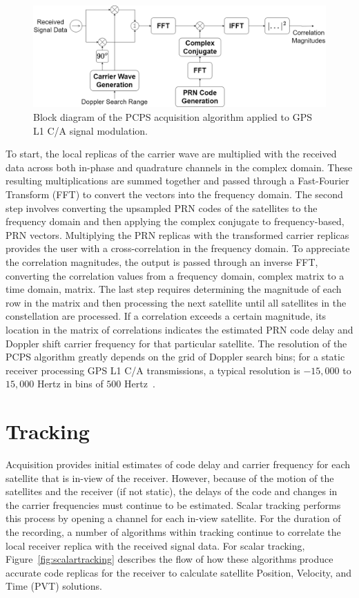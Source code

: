 \begin{figure}[!ht]\label{fig:PCPS}
    \centering
    \includegraphics[width=\linewidth]{Figures/PCPS.drawio.png}
    \caption{Block diagram of the PCPS acquisition algorithm applied to GPS L1 C/A signal modulation.}
\end{figure}

To start, the local replicas of the carrier wave are multiplied with the received data across both in-phase and quadrature channels in the complex domain. These resulting multiplications are summed together and passed through a Fast-Fourier Transform (FFT) to convert the vectors into the frequency domain. The second step involves converting the upsampled PRN codes of the satellites to the frequency domain and then applying the complex conjugate to frequency-based, PRN vectors. Multiplying the PRN replicas with the transformed carrier replicas provides the user with a cross-correlation in the frequency domain. To appreciate the correlation magnitudes, the output is passed through an inverse FFT, converting the correlation values from a frequency domain, complex matrix to a time domain, matrix. The last step requires determining the magnitude of each row in the matrix and then processing the next satellite until all satellites in the constellation are processed. If a correlation exceeds a certain magnitude, its location in the matrix of correlations indicates the estimated PRN code delay and Doppler shift carrier frequency for that particular satellite. The resolution of the PCPS algorithm greatly depends on the grid of Doppler search bins; for a static receiver processing GPS L1 C/A transmissions, a typical resolution is \(-15,000\) to \(15,000\) Hertz in bins of \(500\) Hertz~\cite{scottRapidSignalAcquisition2001}.

\section{\textbf{Tracking}}
Acquisition provides initial estimates of code delay and carrier frequency for each satellite that is in-view of the receiver. However, because of the motion of the satellites and the receiver (if not static), the delays of the code and changes in the carrier frequencies must continue to be estimated. Scalar tracking performs this process by opening a channel for each in-view satellite. For the duration of the recording, a number of algorithms within tracking continue to correlate the local receiver replica with the received signal data. For scalar tracking, Figure~\ref{fig:scalartracking} describes the flow of how these algorithms produce accurate code replicas for the receiver to calculate satellite Position, Velocity, and Time (PVT) solutions.

